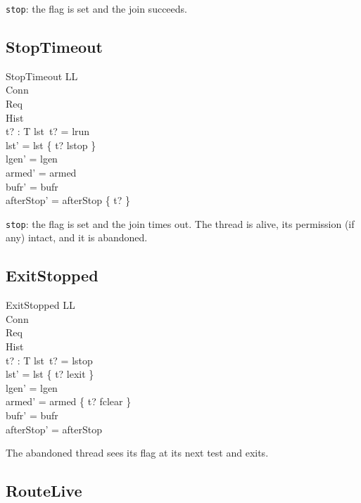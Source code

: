 \documentclass[a4paper,10pt,fleqn]{article}
\begin{document}
\texttt{stop}: the flag is set and the join succeeds.

\subsection{StopTimeout}

\begin{schema}{StopTimeout}
  \Delta LL \\
  \Xi Conn \\
  \Xi Req \\
  \Xi Hist \\
  t? : T
\where
  lst~t? = lrun \\
  lst' = lst \oplus \{ t? \mapsto lstop \} \\
  lgen' = lgen \\
  armed' = armed \\
  bufr' = bufr \\
  afterStop' = afterStop \oplus \{ t?  \}
\end{schema}

\texttt{stop}: the flag is set and the join times out.  The thread is alive, its permission (if any) intact, and it is abandoned.

\subsection{ExitStopped}

\begin{schema}{ExitStopped}
  \Delta LL \\
  \Xi Conn \\
  \Xi Req \\
  \Xi Hist \\
  t? : T
\where
  lst~t? = lstop \\
  lst' = lst \oplus \{ t? \mapsto lexit \} \\
  lgen' = lgen \\
  armed' = armed \oplus \{ t? \mapsto fclear \} \\
  bufr' = bufr \\
  afterStop' = afterStop
\end{schema}

The abandoned thread sees its flag at its next test and exits.

\subsection{RouteLive}
\end{document}
